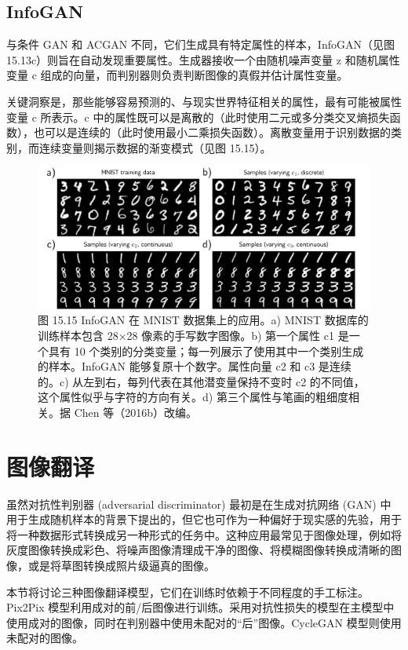 \subsection{InfoGAN}
与条件 GAN 和 ACGAN 不同，它们生成具有特定属性的样本，InfoGAN（见图 15.13c）则旨在自动发现重要属性。生成器接收一个由随机噪声变量 z 和随机属性变量 c 组成的向量，而判别器则负责判断图像的真假并估计属性变量。

关键洞察是，那些能够容易预测的、与现实世界特征相关的属性，最有可能被属性变量 c 所表示。c 中的属性既可以是离散的（此时使用二元或多分类交叉熵损失函数），也可以是连续的（此时使用最小二乘损失函数）。离散变量用于识别数据的类别，而连续变量则揭示数据的渐变模式（见图 15.15）。

\begin{figure}[ht!]
\centering
\includegraphics[width=0.7\linewidth]{png/chapter15/GanInfoGAN.png}
\caption{图 15.15 InfoGAN 在 MNIST 数据集上的应用。a) MNIST 数据库的训练样本包含 28×28 像素的手写数字图像。b) 第一个属性 c1 是一个具有 10 个类别的分类变量；每一列展示了使用其中一个类别生成的样本。InfoGAN 能够复原十个数字。属性向量 c2 和 c3 是连续的。c) 从左到右，每列代表在其他潜变量保持不变时 c2 的不同值，这个属性似乎与字符的方向有关。d) 第三个属性与笔画的粗细度相关。据 Chen 等（2016b）改编。}
\end{figure}


\section{图像翻译}
虽然对抗性判别器 (adversarial discriminator) 最初是在生成对抗网络 (GAN) 中用于生成随机样本的背景下提出的，但它也可作为一种偏好于现实感的先验，用于将一种数据形式转换成另一种形式的任务中。这种应用最常见于图像处理，例如将灰度图像转换成彩色、将噪声图像清理成干净的图像、将模糊图像转换成清晰的图像，或是将草图转换成照片级逼真的图像。

本节将讨论三种图像翻译模型，它们在训练时依赖于不同程度的手工标注。Pix2Pix 模型利用成对的前/后图像进行训练。采用对抗性损失的模型在主模型中使用成对的图像，同时在判别器中使用未配对的“后”图像。CycleGAN 模型则使用未配对的图像。

